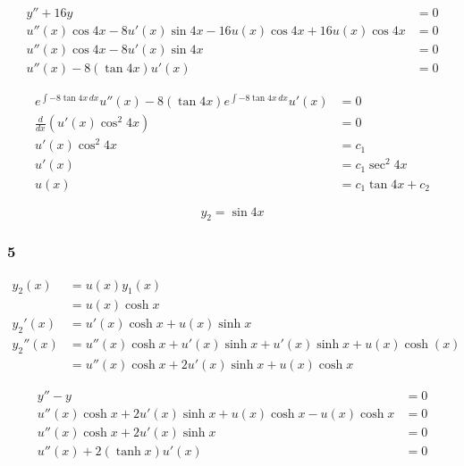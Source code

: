 \documentclass{article}
\begin{document}
\begin{align*}
  y'' + 16y                                                            & = 0 \\
  u''(x) \cos 4x - 8 u'(x) \sin 4x - 16 u(x) \cos 4x + 16 u(x) \cos 4x & = 0 \\
  u''(x) \cos 4x - 8 u'(x) \sin 4x                                     & = 0 \\
  u''(x) - 8 (\tan 4x) u'(x)                                           & = 0
\end{align*}

\begin{align*}
  e^{\int -8 \tan 4x \,dx} u''(x) - 8 (\tan 4x) e^{\int -8 \tan 4x \,dx} u'(x) & = 0                 \\
  \frac{d}{dx} (u'(x) \cos^2 4x)                                               & = 0                 \\
  u'(x) \cos^2 4x                                                              & = c_1               \\
  u'(x)                                                                        & = c_1 \sec^2 4x     \\
  u(x)                                                                         & = c_1 \tan 4x + c_2
\end{align*}

\[y_2 = \sin 4x\]

\subsubsection{5}

\begin{align*}
  y_2(x)   & = u(x) y_1(x)                                                    \\
           & = u(x) \cosh x                                                   \\
  y_2'(x)  & = u'(x) \cosh x + u(x) \sinh x                                   \\
  y_2''(x) & = u''(x) \cosh x + u'(x) \sinh x + u'(x) \sinh x + u(x) \cosh(x) \\
           & = u''(x) \cosh x + 2 u'(x) \sinh x + u(x) \cosh x
\end{align*}

\begin{align*}
  y'' - y                                                        & = 0 \\
  u''(x) \cosh x + 2 u'(x) \sinh x + u(x) \cosh x - u(x) \cosh x & = 0 \\
  u''(x) \cosh x + 2 u'(x) \sinh x                               & = 0 \\
  u''(x) + 2 (\tanh x) u'(x)                                     & = 0
\end{align*}
\end{document}
